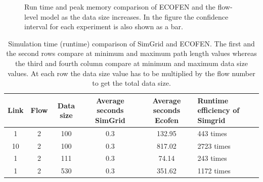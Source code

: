 \begin{figure}[ht]
	\centering
	\centering
	\caption{Run time and peak memory comparison of ECOFEN and the flow-level model as the data size increases. In the figure the confidence interval for each experiment is also shown as a bar.}
	\label{fig:scaldata}
\end{figure}

\begin{table}
	\caption{Simulation time (runtime) comparison of SimGrid and ECOFEN. The first and the second rows compare at minimum and maximum path length values whereas the third and fourth column compare at minimum and maximum data size values. At each row the data size value has to be multiplied by the flow number to get the total data size.}
	\label{table:runtime}
	\begin{tabular}{cccccl} 
		\toprule
		\textbf{Link} &	\textbf{Flow}&\textbf{Data size} & \textbf{Average seconds SimGrid} & \textbf{Average seconds Ecofen}& \textbf{Runtime efficiency of Simgrid}\\ 
		\midrule
		1&2&100&0.3&132.95&443 times\\
		10&2&100&0.3&817.02&2723 times\\ 
		1&2&111&0.3&74.14&243 times \\ 	 
		1&2&530&0.3&351.62&1172 times\\ 
		\bottomrule
	\end{tabular} 
	
\end{table}

